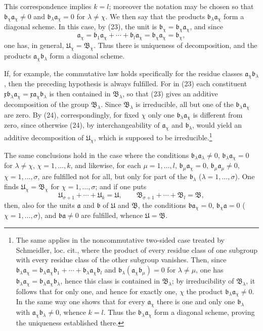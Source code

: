 \documentclass[11pt]{article}
\newcommand{\mB}{\mathfrak{B}}
\newcommand{\ma}{\mathfrak{a}}
\newcommand{\mb}{\mathfrak{b}}
\newcommand{\mx}{\mathfrak{x}}
\newcommand{\mU}{\mathfrak{U}}
\begin{document}
This correspondence implies $k=l$; moreover the notation may be chosen so that $\mb_\chi\ma_\chi\ne0$ and $\mb_\lambda\ma_\chi=0$ for $\lambda\ne\chi$. We then say that the products $\mb_\lambda\ma_\chi$ form a diagonal scheme. In this case, by (23), the unit is $\mb_\chi=\mb_\chi\ma_\chi$, and since
\begin{equation}
 \ma_\chi=\mb_1\ma_\chi+\cdots+\mb_l\ma_\chi=\mb_\chi\ma_\chi=\mb_\chi,
\tag{24}
\end{equation}
one has, in general, $\mU_\chi=\mB_\chi$. Thus there is uniqueness of decomposition, and the products $\ma_\chi\mb_\lambda$ form a diagonal scheme.

If, for example, the commutative law holds specifically for the residue classes $\ma_\chi\mb_\lambda$, then the preceding hypothesis is always fulfilled. For in (23) each constituent $\mx\mb_\lambda\ma_\chi=\mx\ma_\chi\mb_\lambda$ is then contained in $\mB_\lambda$, so that (23) gives an additive decomposition of the group $\mB_\lambda$. Since $\mB_\lambda$ is irreducible, all but one of the $\mb_\lambda\ma_\chi$ are zero. By (24), correspondingly, for fixed $\chi$ only one $\mb_\lambda\ma_\chi$ is different from zero, since otherwise (24), by interchangeability of $\ma_\chi$ and $\mb_\lambda$, would yield an additive decomposition of $\mU_\chi$, which is supposed to be irreducible.\footnote{The same applies in the noncommutative two-sided case treated by Schmeidler, loc. cit., where the product of every residue class of one subgroup with every residue class of the other subgroup vanishes. Then, since $\mb_\lambda\ma_\chi=\mb_\lambda\ma_\chi\mb_1+
\cdots+\mb_\lambda\ma_\chi\mb_l$ and $\mb_\lambda(\ma_\chi\mb_\mu)=0$ for $\lambda\ne\mu$, one has $\mb_\lambda\ma_\chi=\mb_\lambda\ma_\chi\mb_\lambda$, hence this class is contained in $\mB_\lambda$; by irreducibility of $\mB_\lambda$, it follows that for only one, and hence for exactly one, $\chi$ the product $\mb_\lambda\ma_\chi\ne0$. In the same way one shows that for every $\ma_\chi$ there is one and only one $\mb_\lambda$ with $\ma_\chi\mb_\lambda\ne0$, whence $k=l$. Thus the $\mb_\lambda\ma_\chi$ form a diagonal scheme, proving the uniqueness established there.}

The same conclusions hold in the case where the conditions $\mb_\lambda\ma_\lambda\ne0$, $\mb_\lambda\ma_\chi=0$ for $\lambda\ne\chi$, $\chi=1,
\ldots,k$, and likewise, for each $\mu=1,
\ldots,l$, $\mb_\mu\ma_\chi=0$, $\mb_\mu\ma_\mu\ne0$, $\chi=1,
\ldots,\sigma$, are fulfilled not for all, but only for part of the $\mb_\lambda$ ($\lambda=1,
\ldots,\sigma$). One finds $\mU_\chi=\mB_\chi$ for $\chi=1,
\ldots,\sigma$; and if one puts
\[
 \mU_{\sigma+1}+\cdots+\mU_k=\mU,
 \qquad
 \mB_{\sigma+1}+\cdots+\mB_l=\mB,
\]
then, also for the units $\ma$ and $\mb$ of $\mU$ and $\mB$, the conditions $\mb\ma_\chi=0$, $\mb_\chi\ma=0$ ($\chi=1,
\ldots,\sigma$), and $\mb\ma\ne0$ are fulfilled, whence $\mU=\mB$.
\end{document}
